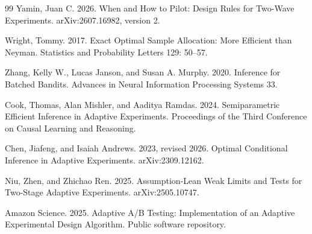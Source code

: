 \documentclass{article}
\begin{document}
\begin{thebibliography}{99}
   Yamin, Juan C. 2026. When and How to Pilot: Design Rules for Two-Wave Experiments. arXiv:2607.16982, version 2.

   Wright, Tommy. 2017. Exact Optimal Sample Allocation: More Efficient than Neyman. Statistics and Probability Letters 129: 50--57.

   Zhang, Kelly W., Lucas Janson, and Susan A. Murphy. 2020. Inference for Batched Bandits. Advances in Neural Information Processing Systems 33.

   Cook, Thomas, Alan Mishler, and Aaditya Ramdas. 2024. Semiparametric Efficient Inference in Adaptive Experiments. Proceedings of the Third Conference on Causal Learning and Reasoning.

   Chen, Jiafeng, and Isaiah Andrews. 2023, revised 2026. Optimal Conditional Inference in Adaptive Experiments. arXiv:2309.12162.

   Niu, Zhen, and Zhichao Ren. 2025. Assumption-Lean Weak Limits and Tests for Two-Stage Adaptive Experiments. arXiv:2505.10747.

   Amazon Science. 2025. Adaptive A/B Testing: Implementation of an Adaptive Experimental Design Algorithm. Public software repository.

\end{thebibliography}
\end{document}
